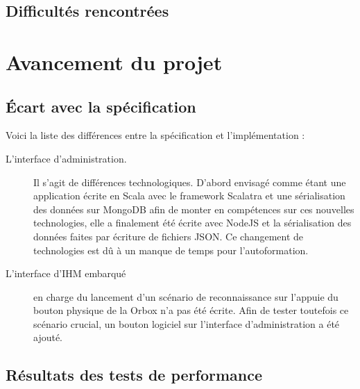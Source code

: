 \documentclass[a4paper]{report}
\begin{document}
\section{Difficultés rencontrées}
\label{diff}


\chapter{Avancement du projet}
\section{Écart avec la spécification}
Voici la liste des différences entre la spécification et l'implémentation :
\begin{description}
    \item[L'interface d'administration.] Il s'agit de différences technologiques.
    D'abord envisagé comme étant une application écrite en Scala avec le framework Scalatra et une sérialisation des données sur MongoDB afin de monter en compétences sur ces nouvelles technologies, elle a finalement été écrite avec NodeJS et la sérialisation des données faites par écriture de fichiers JSON.
    Ce changement de technologies est dû à un manque de temps pour l'autoformation.
    \item[L'interface d'IHM embarqué] en charge du lancement d'un scénario de reconnaissance sur l'appuie du bouton physique de la Orbox n'a pas été écrite.
    Afin de tester toutefois ce scénario crucial, un bouton logiciel sur l'interface d'administration a été ajouté.
\end{description}

\section{Résultats des tests de performance}
\end{document}
